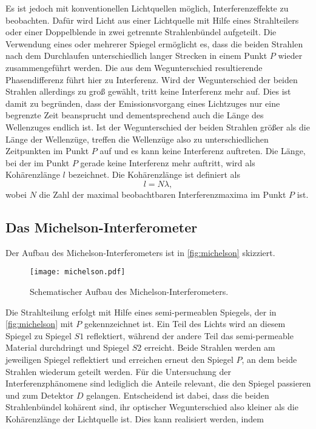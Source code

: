 Es ist jedoch mit konventionellen Lichtquellen möglich, Interferenzeffekte zu beobachten. Dafür wird Licht aus einer 
Lichtquelle mit Hilfe eines Strahlteilers oder einer Doppelblende in zwei getrennte Strahlenbündel aufgeteilt. Die 
Verwendung eines oder mehrerer Spiegel ermöglicht es, dass die beiden Strahlen nach dem Durchlaufen unterschiedlich 
langer Strecken in einem Punkt $P$ wieder zusammengeführt werden. Die aus dem Wegunterschied resultierende 
Phasendifferenz führt hier zu Interferenz. 
Wird der Wegunterschied der beiden Strahlen allerdings zu groß gewählt, tritt keine Interferenz mehr auf. Dies ist damit
zu begründen, dass der Emissionsvorgang eines Lichtzuges nur eine begrenzte Zeit beansprucht und dementsprechend auch die
Länge des Wellenzuges endlich ist. Ist der Wegunterschied der beiden Strahlen größer als die Länge der Wellenzüge, treffen
die Wellenzüge also zu unterschiedlichen Zeitpunkten im Punkt $P$ auf und es kann keine Interferenz auftreten. Die
Länge, bei der im Punkt $P$ gerade keine Interferenz mehr auftritt, wird als Kohärenzlänge $l$ bezeichnet. 
Die Kohärenzlänge ist definiert als
\begin{equation}
    l = N \lambda ,
\end{equation}
wobei $N$ die Zahl der maximal beobachtbaren Interferenzmaxima im Punkt $P$ ist. 

\subsection{Das Michelson-Interferometer}
\label{ssec:Michelson}

Der Aufbau des Michelson-Interferometers ist in \autoref{fig:michelson} skizziert. 

\begin{figure}
    \centering
    \texttt{[image: michelson.pdf]}
    \caption{Schematischer Aufbau des Michelson-Interferometers.}
    \label{fig:michelson}
  \end{figure}

Die Strahlteilung erfolgt mit Hilfe eines semi-permeablen Spiegels, der in \autoref{fig:michelson} mit $P$ gekennzeichnet
ist. Ein Teil des Lichts wird an diesem Spiegel zu Spiegel $S1$ reflektiert, während der andere Teil das semi-permeable 
Material durchdringt und Spiegel $S2$ erreicht. Beide Strahlen werden am jeweiligen Spiegel reflektiert und erreichen 
erneut den Spiegel $P$, an dem beide Strahlen wiederum geteilt werden. Für die Untersuchung der Interferenzphänomene sind
lediglich die Anteile relevant, die den Spiegel passieren und zum Detektor $D$ gelangen. Entscheidend ist dabei, dass
die beiden Strahlenbündel kohärent sind, ihr optischer Wegunterschied also kleiner als die Kohärenzlänge der Lichtquelle ist.
Dies kann realisiert werden, indem


\cite{sample}
